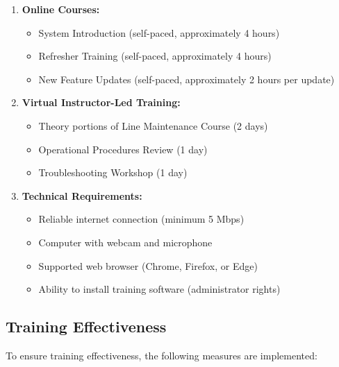 \documentclass[12pt,a4paper,twoside,openright]{book}
\begin{document}
\begin{enumerate}
    \item \textbf{Online Courses:}
    \begin{itemize}
        \item System Introduction (self-paced, approximately 4 hours)
        \item Refresher Training (self-paced, approximately 4 hours)
        \item New Feature Updates (self-paced, approximately 2 hours per update)
    \end{itemize}
    
    \item \textbf{Virtual Instructor-Led Training:}
    \begin{itemize}
        \item Theory portions of Line Maintenance Course (2 days)
        \item Operational Procedures Review (1 day)
        \item Troubleshooting Workshop (1 day)
    \end{itemize}
    
    \item \textbf{Technical Requirements:}
    \begin{itemize}
        \item Reliable internet connection (minimum 5 Mbps)
        \item Computer with webcam and microphone
        \item Supported web browser (Chrome, Firefox, or Edge)
        \item Ability to install training software (administrator rights)
    \end{itemize}
\end{enumerate}

\subsection{Training Effectiveness}

To ensure training effectiveness, the following measures are implemented:
\end{document}
